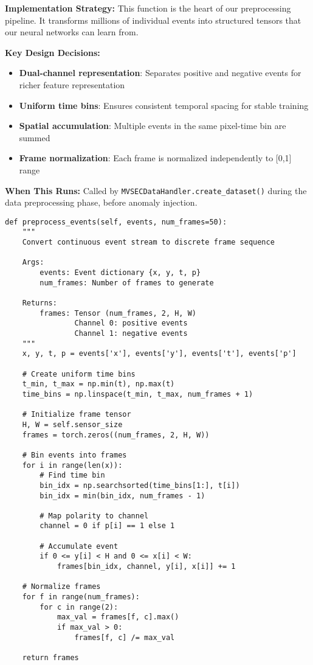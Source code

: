 \documentclass[12pt,a4paper]{article}
\begin{document}
\textbf{Implementation Strategy:} This function is the heart of our preprocessing pipeline. It transforms millions of individual events into structured tensors that our neural networks can learn from.

\textbf{Key Design Decisions:}
\begin{itemize}
    \item \textbf{Dual-channel representation}: Separates positive and negative events for richer feature representation
    \item \textbf{Uniform time bins}: Ensures consistent temporal spacing for stable training
    \item \textbf{Spatial accumulation}: Multiple events in the same pixel-time bin are summed
    \item \textbf{Frame normalization}: Each frame is normalized independently to [0,1] range
\end{itemize}

\textbf{When This Runs:} Called by \texttt{MVSECDataHandler.create\_dataset()} during the data preprocessing phase, before anomaly injection.

\begin{lstlisting}[caption={Temporal Binning Implementation - Converting Events to Neural Network Input}]
def preprocess_events(self, events, num_frames=50):
    """
    Convert continuous event stream to discrete frame sequence

    Args:
        events: Event dictionary {x, y, t, p}
        num_frames: Number of frames to generate

    Returns:
        frames: Tensor (num_frames, 2, H, W)
                Channel 0: positive events
                Channel 1: negative events
    """
    x, y, t, p = events['x'], events['y'], events['t'], events['p']

    # Create uniform time bins
    t_min, t_max = np.min(t), np.max(t)
    time_bins = np.linspace(t_min, t_max, num_frames + 1)

    # Initialize frame tensor
    H, W = self.sensor_size
    frames = torch.zeros((num_frames, 2, H, W))

    # Bin events into frames
    for i in range(len(x)):
        # Find time bin
        bin_idx = np.searchsorted(time_bins[1:], t[i])
        bin_idx = min(bin_idx, num_frames - 1)

        # Map polarity to channel
        channel = 0 if p[i] == 1 else 1

        # Accumulate event
        if 0 <= y[i] < H and 0 <= x[i] < W:
            frames[bin_idx, channel, y[i], x[i]] += 1

    # Normalize frames
    for f in range(num_frames):
        for c in range(2):
            max_val = frames[f, c].max()
            if max_val > 0:
                frames[f, c] /= max_val

    return frames
\end{lstlisting}
\end{document}

